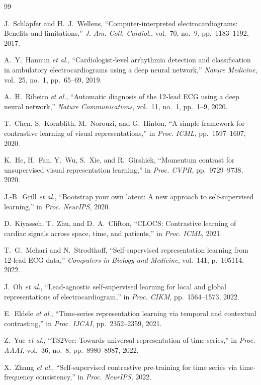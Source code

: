 \documentclass[journal,10pt]{IEEEtran}
\newcommand{\etal}{\textit{et al.}}
\begin{document}
\begin{thebibliography}{99}

J.~Schl\"apfer and H.~J.~Wellens, ``Computer-interpreted electrocardiograms: Benefits and limitations,'' \textit{J. Am. Coll. Cardiol.}, vol.~70, no.~9, pp.~1183--1192, 2017.

A.~Y.~Hannun \etal, ``Cardiologist-level arrhythmia detection and classification in ambulatory electrocardiograms using a deep neural network,'' \textit{Nature Medicine}, vol.~25, no.~1, pp.~65--69, 2019.

A.~H.~Ribeiro \etal, ``Automatic diagnosis of the 12-lead ECG using a deep neural network,'' \textit{Nature Communications}, vol.~11, no.~1, pp.~1--9, 2020.

T.~Chen, S.~Kornblith, M.~Norouzi, and G.~Hinton, ``A simple framework for contrastive learning of visual representations,'' in \textit{Proc. ICML}, pp.~1597--1607, 2020.

K.~He, H.~Fan, Y.~Wu, S.~Xie, and R.~Girshick, ``Momentum contrast for unsupervised visual representation learning,'' in \textit{Proc. CVPR}, pp.~9729--9738, 2020.

J.-B.~Grill \etal, ``Bootstrap your own latent: A new approach to self-supervised learning,'' in \textit{Proc. NeurIPS}, 2020.

D.~Kiyasseh, T.~Zhu, and D.~A.~Clifton, ``CLOCS: Contrastive learning of cardiac signals across space, time, and patients,'' in \textit{Proc. ICML}, 2021.

T.~G.~Mehari and N.~Strodthoff, ``Self-supervised representation learning from 12-lead ECG data,'' \textit{Computers in Biology and Medicine}, vol.~141, p.~105114, 2022.

J.~Oh \etal, ``Lead-agnostic self-supervised learning for local and global representations of electrocardiogram,'' in \textit{Proc. CIKM}, pp.~1564--1573, 2022.

E.~Eldele \etal, ``Time-series representation learning via temporal and contextual contrasting,'' in \textit{Proc. IJCAI}, pp.~2352--2359, 2021.

Z.~Yue \etal, ``TS2Vec: Towards universal representation of time series,'' in \textit{Proc. AAAI}, vol.~36, no.~8, pp.~8980--8987, 2022.

X.~Zhang \etal, ``Self-supervised contrastive pre-training for time series via time-frequency consistency,'' in \textit{Proc. NeurIPS}, 2022.


\end{thebibliography}
\end{document}
